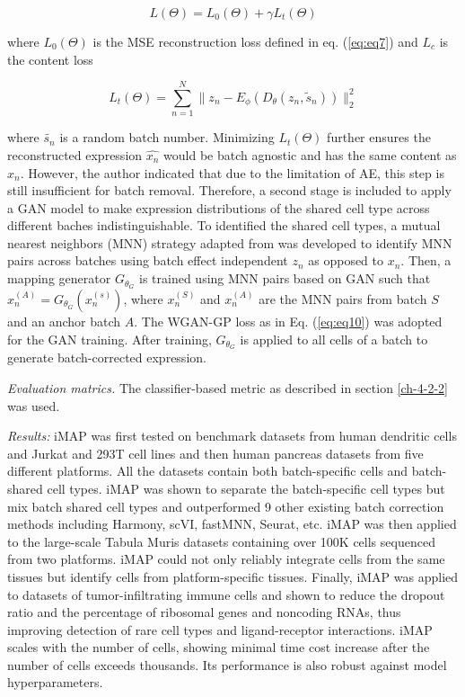 \documentclass[
]{book}
\begin{document}
\begin{equation}
L(\Theta)=L_{0}(\Theta)+\gamma L_{t}(\Theta) \label{eq:eq24}
\end{equation}

where \(L_{0}(\Theta)\) is the MSE reconstruction loss defined in eq. (\eqref{eq:eq7}) and \(L_{c}\) is the content loss

\begin{equation}
L_{t}(\Theta)= \sum_{n=1}^{N} \| z_{n}-E_{\phi}(D_{\theta}(z_{n},\tilde{s}_{n})) \|_{2}^{2} \label{eq:eq25}
\end{equation}

where \(\tilde{s_{n}}\) is a random batch number. Minimizing \(L_{t}(\Theta)\) further ensures the reconstructed expression \(\hat{x_{n}}\) would be batch agnostic and has the same content as \(x_{n}\).
However, the author indicated that due to the limitation of AE, this step is still insufficient for batch removal. Therefore, a second stage is included to apply a GAN model to make expression distributions of the shared cell type across different baches indistinguishable. To identified the shared cell types, a mutual nearest neighbors (MNN) strategy adapted from \citep{RN84} was developed to identify MNN pairs across batches using batch effect independent \(z_{n}\) as opposed to \(x_{n}\). Then, a mapping generator \(G_{\theta_{G}}\) is trained using MNN pairs based on GAN such that \(x_{n}^{(A)} =G_{\theta_{G}}(x_{n}^{(s)})\), where \(x_{n}^{(S)}\) and \(x_{n}^{(A)}\) are the MNN pairs from batch \(S\) and an anchor batch \(A\). The WGAN-GP loss as in Eq. (\eqref{eq:eq10}) was adopted for the GAN training. After training, \(G_{\theta_{G}}\) is applied to all cells of a batch to generate batch-corrected expression.

\emph{Evaluation matrics.} The classifier-based metric as described in section \ref{ch-4-2-2} was used.

\emph{Results:} iMAP was first tested on benchmark datasets from human dendritic cells and Jurkat and 293T cell lines and then human pancreas datasets from five different platforms. All the datasets contain both batch-specific cells and batch-shared cell types. iMAP was shown to separate the batch-specific cell types but mix batch shared cell types and outperformed 9 other existing batch correction methods including Harmony, scVI, fastMNN, Seurat, etc. iMAP was then applied to the large-scale Tabula Muris datasets containing over 100K cells sequenced from two platforms. iMAP could not only reliably integrate cells from the same tissues but identify cells from platform-specific tissues. Finally, iMAP was applied to datasets of tumor-infiltrating immune cells and shown to reduce the dropout ratio and the percentage of ribosomal genes and noncoding RNAs, thus improving detection of rare cell types and ligand-receptor interactions. iMAP scales with the number of cells, showing minimal time cost increase after the number of cells exceeds thousands. Its performance is also robust against model hyperparameters.
\end{document}
